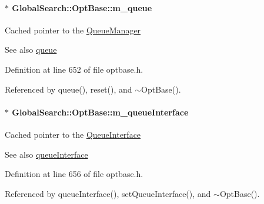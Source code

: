 \paragraph[{m\+\_\+queue}]{$\ast$ Global\+Search\+::\+Opt\+Base\+::m\+\_\+queue\hspace{0.3cm}{\ttfamily [protected]}}\label{classGlobalSearch_1_1OptBase_a187a29ceafe0c4a45ecb7a925267f93a}
Cached pointer to the \hyperlink{classGlobalSearch_1_1QueueManager}{Queue\+Manager} \begin{DoxySeeAlso}{See also}
\hyperlink{classGlobalSearch_1_1OptBase_aa10982ae8ea63745203a025b2be8054d}{queue} 
\end{DoxySeeAlso}


Definition at line 652 of file optbase.\+h.



Referenced by queue(), reset(), and $\sim$\+Opt\+Base().

\hypertarget{classGlobalSearch_1_1OptBase_a8f5f83dae1456bbff32ea9b3b6731ba0}{}
\paragraph[{m\+\_\+queue\+Interface}]{$\ast$ Global\+Search\+::\+Opt\+Base\+::m\+\_\+queue\+Interface\hspace{0.3cm}{\ttfamily [protected]}}\label{classGlobalSearch_1_1OptBase_a8f5f83dae1456bbff32ea9b3b6731ba0}
Cached pointer to the \hyperlink{classGlobalSearch_1_1QueueInterface}{Queue\+Interface} \begin{DoxySeeAlso}{See also}
\hyperlink{classGlobalSearch_1_1OptBase_a73faf60edcd3db57538349f5a636576e}{queue\+Interface} 
\end{DoxySeeAlso}


Definition at line 656 of file optbase.\+h.



Referenced by queue\+Interface(), set\+Queue\+Interface(), and $\sim$\+Opt\+Base().

\hypertarget{classGlobalSearch_1_1OptBase_a723a6dd0bb93aff451007ccb079e2f65}{}
